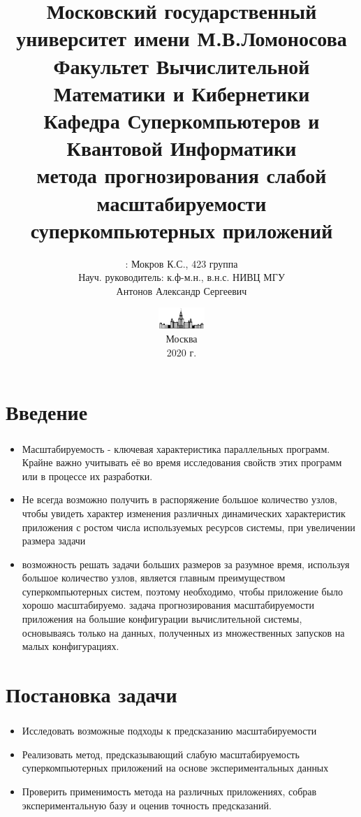 \documentclass[unicode, t, 11pt]{beamer}%
\title{
	{\footnotesize\color{black}Московский государственный университет имени М.В.Ломоносова\\
    Факультет Вычислительной Математики и Кибернетики\\
    Кафедра Суперкомпьютеров и Квантовой Информатики\\}
    \vspace{\baselineskip}
    {\LARGEРазработка метода прогнозирования слабой масштабируемости суперкомпьютерных приложений}
}
\author{\footnotesizeСтудент: Мокров К.С., 423 группа\\
		Науч. руководитель: к.ф-м.н.,
		в.н.с. НИВЦ МГУ\\
		Антонов Александр Сергеевич}
\date{\includegraphics[height=0.8cm]{./images/MSU}\\
	  \scriptsize
	  Москва\\
	  2020 г.}
\begin{document}
	\frame[plain]{\titlepage}	%

	\section{Введение}
		\begin{frame}
		\footnotesize
		\frametitle{\insertsection}
		\begin{itemize}[label = \(\bullet\)]
		\item Масштабируемость - ключевая характеристика параллельных программ. Крайне важно учитывать её во время исследования свойств этих программ или в процессе их разработки.
		\item Не всегда возможно получить в распоряжение большое количество узлов, чтобы увидеть характер изменения различных динамических характеристик приложения с ростом числа используемых ресурсов системы, при увеличении размера задачи
		\item возможность решать задачи больших размеров за разумное время, используя большое количество узлов, является главным преимуществом суперкомпьютерных систем, поэтому необходимо, чтобы приложение было хорошо масштабируемо.
		 задача прогнозирования масштабируемости приложения на большие конфигурации вычислительной системы, основываясь только на данных, полученных из множественных запусков на малых конфигурациях.

		\end{itemize}
		\end{frame}

	\section{Постановка задачи}
		\begin{frame}
			\frametitle{\insertsection}
			\begin{itemize}[label=\(\bullet\)]
				\item Исследовать возможные подходы к предсказанию масштабируемости
				\item Реализовать метод, предсказывающий слабую масштабируемость суперкомпьютерных приложений на основе экспериментальных данных
				\item Проверить применимость метода на различных приложениях, собрав экспериментальную базу и оценив точность предсказаний.
			\end{itemize}
		\end{frame}
\end{document}
